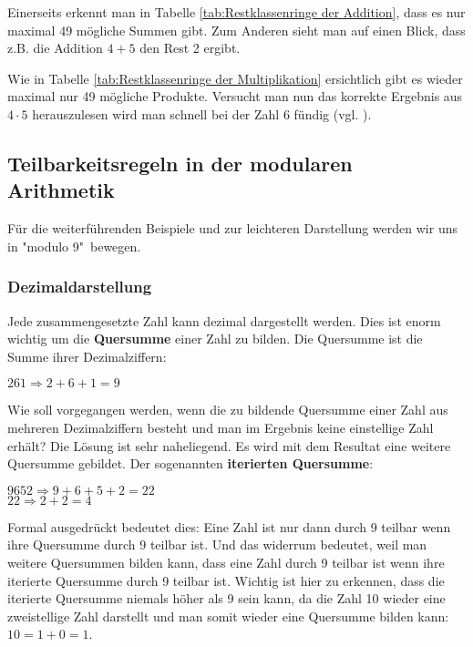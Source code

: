 \documentclass[12pt,a4paper]{article}
\theoremstyle{definition}
\begin{document}
Einerseits erkennt man in Tabelle \ref{tab:Restklassenringe der Addition}, dass es nur maximal 49 mögliche Summen gibt.
Zum Anderen sieht man auf einen Blick, dass z.B. die Addition $4 + 5$ den Rest 2 ergibt.

Wie in Tabelle \ref{tab:Restklassenringe der Multiplikation} ersichtlich gibt es wieder maximal nur 49 mögliche Produkte.
Versucht man nun das korrekte Ergebnis aus $4 \cdot 5$ herauszulesen wird man schnell bei der Zahl 6 fündig (vgl. \cite[68]{RempeGillen2009}).

\newpage
\subsection{Teilbarkeitsregeln in der modularen Arithmetik}
Für die weiterführenden Beispiele und zur leichteren Darstellung werden wir uns in "modulo 9"\ bewegen.

\subsubsection{Dezimaldarstellung}
Jede zusammengesetzte Zahl kann dezimal dargestellt werden.
Dies ist enorm wichtig um die \textbf{Quersumme} einer Zahl zu bilden.
Die Quersumme ist die Summe ihrer Dezimalziffern:
\begin{center}
$261 \Rightarrow 2 + 6 +1 = 9$
\end{center}
Wie soll vorgegangen werden, wenn die zu bildende Quersumme einer Zahl aus mehreren Dezimalziffern besteht und man im Ergebnis keine einstellige Zahl erhält?
Die Lösung ist sehr naheliegend.
Es wird mit dem Resultat eine weitere Quersumme gebildet.
Der sogenannten \textbf{iterierten Quersumme}:
\begin{center}
$9652 \Rightarrow 9 + 6 + 5 + 2 = 22$\\
$ 22 \Rightarrow 2 + 2 = 4$
\end{center}
Formal ausgedrückt bedeutet dies:\newline
Eine Zahl ist nur dann durch 9 teilbar wenn ihre Quersumme durch 9 teilbar ist.
Und das widerrum bedeutet, weil man weitere Quersummen bilden kann, dass eine Zahl durch 9 teilbar ist wenn ihre iterierte Quersumme durch 9 teilbar ist.
Wichtig ist hier zu erkennen, dass die iterierte Quersumme niemals höher als 9 sein kann, da die Zahl 10 wieder eine zweistellige Zahl darstellt und man somit wieder eine Quersumme bilden kann: $10 = 1 + 0 = 1$.
\end{document}

